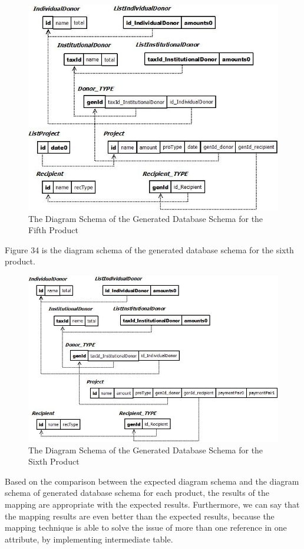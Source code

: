 \documentclass[runningheads,a4paper]{llncs}
\begin{document}
\begin{figure}
	\centering
	\includegraphics[scale=0.6]{Eval5.jpg}
	\caption{The Diagram Schema of the Generated Database Schema for the Fifth Product}
	\label{Figure 33}
\end{figure}

Figure 34 is the diagram schema of the generated database schema for the sixth product.

\begin{figure}
	\centering
	\includegraphics[scale=0.6]{Eval6.jpg}
	\caption{The Diagram Schema of the Generated Database Schema for the Sixth Product}
	\label{Figure 34}
\end{figure}

Based on the comparison between the expected diagram schema and the diagram schema of generated database schema for each product, the results of the mapping are appropriate with the expected results. Furthermore, we can say that the mapping results are even better than the expected results, because the mapping technique is able to solve the issue of more than one reference in one attribute, by implementing intermediate table.
\end{document}
